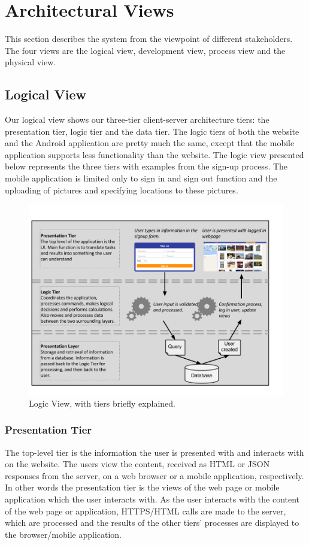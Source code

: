 \section{Architectural Views}
\label{sec:ArchViews}

This section describes the system from the viewpoint of different stakeholders. The four views are the logical view, development view, process view and the physical view. 


\subsection{Logical View}
\label{subsec:ArchViewsLogical}
Our logical view shows our three-tier client-server architecture tiers: the presentation tier, logic tier and the data tier. The logic tiers of both the website and the Android application are pretty much the same, except that the mobile application supports less functionality than the website. The logic view presented below represents the three tiers with examples from the sign-up process. The mobile application is limited only to sign in and sign out function and the uploading of pictures and specifying locations to these pictures.

\begin{landscape}
\begin{figure}[htbp]
\centering
\includegraphics[width=0.8\linewidth]{./Architecture/img/LogicView.png}
\caption{Logic View, with tiers briefly explained. \label{fig:ArchViewsLogical}}
\end{figure}
\end{landscape}

\subsubsection{Presentation Tier}
The top-level tier is the information the user is presented with and interacts with on the website. The users view the content, received as HTML or JSON responses from the server, on a web browser or a mobile application, respectively.  In other words the presentation tier is the views of the web page or mobile application which the user interacts with. As the user interacts with the content of the web page or application, HTTPS/HTML calls are made to the server, which are processed and the results of the other tiers' processes are displayed to the browser/mobile application.

